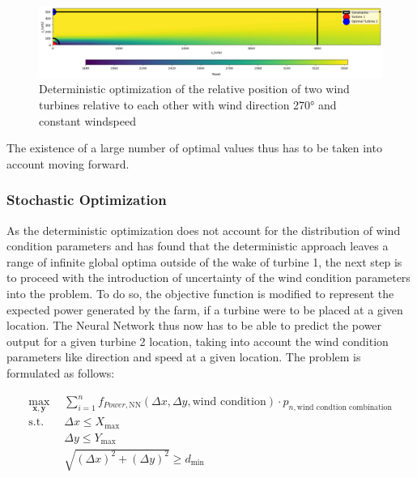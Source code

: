 \documentclass[preprint,12pt]{elsarticle}
\begin{document}
\begin{figure}[h] 
	\centering
	\includegraphics[width=1\textwidth]{../figures/optimization/opti_determ270.png} 
	\caption{Deterministic optimization of the relative position of two wind turbines relative to each other with wind direction 270° and constant windspeed}
	\label{fig:opti_determ270}
\end{figure}

The existence of a large number of optimal values thus has to be taken into account moving forward.

\subsubsection{Stochastic Optimization} \label{sec:stoch_opti_1}

As the deterministic optimization does not account for the distribution of wind condition parameters and has found that the deterministic approach leaves a range of infinite global optima outside of the wake of turbine 1, the next step is to proceed with the introduction of uncertainty of the wind condition parameters into the problem. To do so, the objective function is modified to represent the expected power generated by the farm, if a turbine were to be placed at a given location. The Neural Network thus now has to be able to predict the power output for a given turbine 2 location, taking into account the wind condition parameters like direction and speed at a given location. The problem is formulated as follows: 

\begin{align}
	\max_{\mathbf{x}, \mathbf{y}} &  \sum_{i=1}^{n} f_{Power,\text{NN}}(\Delta x, \Delta y, \text{wind condition})\cdot p_{n,\text{wind condtion combination}} \\
	\text{s.t.} \quad 
	&  \Delta x \leq X_{\max} \\
	&  \Delta y \leq Y_{\max} \\
	& \sqrt{(\Delta x)^2 + (\Delta y)^2} \geq d_{\min}
\end{align}
\end{document}
